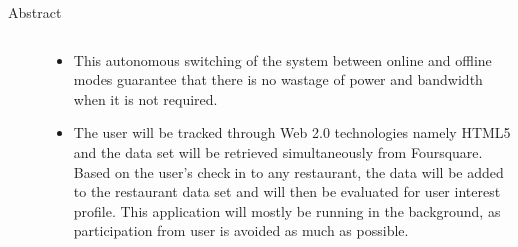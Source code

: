 \documentclass{if-beamer}
\begin{document}
\begin{frame}{Abstract}
\begin{columns}
\begin{column}{0.4\textwidth}
\end{column}

\begin{column}{0.4\textwidth}

\end{column}
\begin{column}{0.4\textwidth}
	\begin{itemize} 
		\item This autonomous 
		switching of the system between online and offline modes 
		guarantee that there is no wastage of power and bandwidth 
		when it is not required. 
		\item The user will be tracked through Web 2.0 technologies 
		 namely HTML5 and the data set will be retrieved 
		simultaneously from Foursquare. Based on the user’s checkin to any restaurant, the data will be added to the restaurant 
		data set and will then be evaluated for user interest profile. 
		This application will mostly be running in the background, 
		as participation from user is avoided as much as possible. 
	\end{itemize}
\end{column}
\end{columns}
	
\end{frame}
\end{document}
